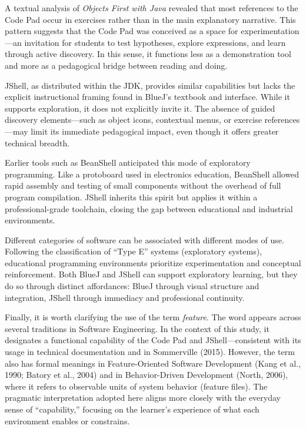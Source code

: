 \documentclass{article}
\begin{document}
A textual analysis of \textit{Objects First with Java} revealed that most references to the Code Pad occur in exercises rather than in the main explanatory narrative. This pattern suggests that the Code Pad was conceived as a space for experimentation—an invitation for students to test hypotheses, explore expressions, and learn through active discovery. In this sense, it functions less as a demonstration tool and more as a pedagogical bridge between reading and doing.

JShell, as distributed within the JDK, provides similar capabilities but lacks the explicit instructional framing found in BlueJ’s textbook and interface. While it supports exploration, it does not explicitly invite it. The absence of guided discovery elements—such as object icons, contextual menus, or exercise references—may limit its immediate pedagogical impact, even though it offers greater technical breadth.

Earlier tools such as BeanShell anticipated this mode of exploratory programming. Like a protoboard used in electronics education, BeanShell allowed rapid assembly and testing of small components without the overhead of full program compilation. JShell inherits this spirit but applies it within a professional-grade toolchain, closing the gap between educational and industrial environments.

Different categories of software can be associated with different modes of use. Following the classification of “Type E” systems (exploratory systems), educational programming environments prioritize experimentation and conceptual reinforcement. Both BlueJ and JShell can support exploratory learning, but they do so through distinct affordances: BlueJ through visual structure and integration, JShell through immediacy and professional continuity.

Finally, it is worth clarifying the use of the term \textit{feature}. The word appears across several traditions in Software Engineering. In the context of this study, it designates a functional capability of the Code Pad and JShell—consistent with its usage in technical documentation and in Sommerville (2015). However, the term also has formal meanings in Feature-Oriented Software Development (Kang et al., 1990; Batory et al., 2004) and in Behavior-Driven Development (North, 2006), where it refers to observable units of system behavior (feature files). The pragmatic interpretation adopted here aligns more closely with the everyday sense of “capability,” focusing on the learner’s experience of what each environment enables or constrains.
\end{document}
